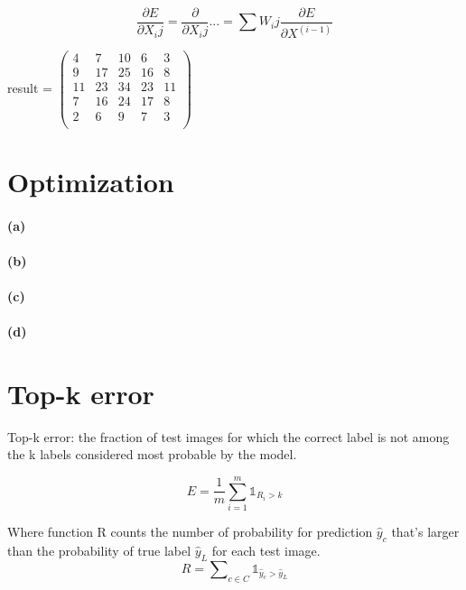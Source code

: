 \documentclass{article}
\begin{document}
\begin{equation}
\frac{\partial E}{\partial X_ij} = \frac{\partial}{\partial X_ij}{...} = \sum\nolimits {W_ij}{ \frac{\partial E}{\partial X^(i-1)}}
\end{equation}

result = 
$\begin{pmatrix}
  4   & 7  & 10 & 6  & 3  \\
  9   & 17 & 25 & 16 & 8  \\
  11  & 23 & 34 & 23 & 11 \\
  7   & 16 & 24 & 17 & 8  \\
  2   & 6  & 9  & 7  & 3  \\
\end{pmatrix}$

\section{Optimization}
\paragraph{(a)}
\paragraph{(b)}
\paragraph{(c)}
\paragraph{(d)}

\section{Top-k error}
Top-k error: the fraction of test images for which the correct label is not among the k labels considered most probable by the model.

\begin{equation}
E = {\frac{1}{m} \sum\limits_{i=1}^{m} \mathds{1}_{R_i > k} } 
\end{equation}

Where function R counts the number of probability for prediction $\hat y_c$ that's larger than the probability of true label $\hat y_L$ for each test image.
\begin{equation}
R = \sum\nolimits_{c \in C} \mathds{1}_{ \hat y_c > \hat y_L }
\end{equation}
\end{document}
